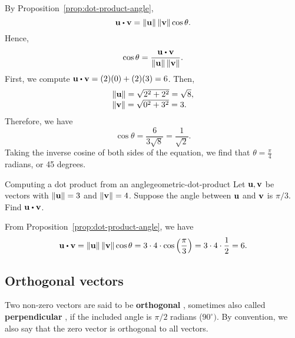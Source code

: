 \begin{solution}
  By Proposition~\ref{prop:dot-product-angle},
  \begin{equation*}
    \vect{u}\dotprod \vect{v}=\norm{\vect{u}} \norm{\vect{v}} \cos \theta.
  \end{equation*}
  Hence,
  \begin{equation*}
    \cos \theta =\frac{\vect{u}\dotprod \vect{v}}{\norm{\vect{u}}\norm{\vect{v}}}.
  \end{equation*}
  First, we compute $\vect{u}\dotprod \vect{v} = (2)(0) + (2)(3) = 6$.
  Then,
  \begin{equation*}
    \begin{array}{l}
      \left\|\mbox{\bf u}\right\| = \sqrt{2^2+2^2}=\sqrt{8},\\
      \left\|\mbox{\bf v}\right\| = \sqrt{0^2+3^2}=3.
    \end{array}
  \end{equation*}
  Therefore, we have
  \begin{equation*}
    \cos \theta =\frac{6}{3\sqrt{8}} = \frac{1}{\sqrt{2}}.
  \end{equation*}
  Taking the inverse cosine of both sides of the equation, we find
  that $\theta =\frac{\pi}{4}$ radians, or 45 degrees.
\end{solution}

\begin{example}{Computing a dot product from an angle}{geometric-dot-product}
  Let $\mbox{\bf u},\mbox{\bf v}$ be vectors with $ \left\|\mbox{\bf u}\right\| = 3$ and $\left\|\mbox{\bf v}\right\| = 4$.
  Suppose the angle between $\mbox{\bf u}$ and $\mbox{\bf v}$ is $\pi / 3$. Find $\vect{u}\dotprod \vect{v}$.
\end{example}

\begin{solution}
  From Proposition~\ref{prop:dot-product-angle}, we have
  \begin{equation*}
    \vect{u}\dotprod \vect{v}
    =\norm{\vect{u}} \norm{\vect{v}} \cos \theta
    =3\cdot 4\cdot \cos\paren{\frac{\pi}{3}}
    =3\cdot 4\cdot \frac{1}{2}=6.
\end{equation*}
\end{solution}

\subsection{Orthogonal vectors}

Two non-zero vectors are said to be \textbf{orthogonal}%
%
, sometimes also called
\textbf{perpendicular}%
%
, if the included angle is $\pi /2$
radians ($90^{\circ })$. By convention, we also say that the zero
vector is orthogonal to all vectors.

